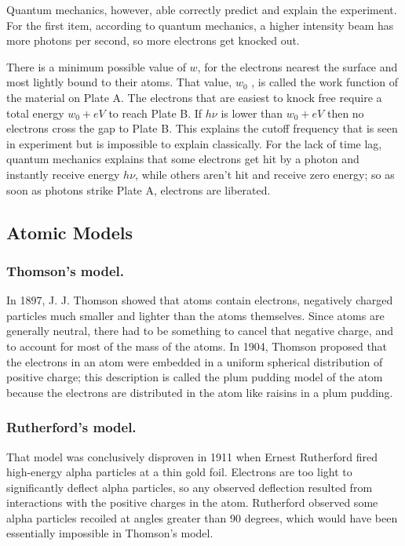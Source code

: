 \documentclass[../main.tex]{subfiles}
\begin{document}
Quantum mechanics, however, able correctly predict and explain the experiment. For the first item, according to quantum mechanics, a higher intensity beam has more photons per second, so more electrons get knocked out. 

There is a minimum possible value of $w$, for the electrons nearest the surface and most lightly bound to their atoms. That value, $w_0$ , is called the work function of the material on Plate A. The electrons that are easiest to knock free require a total energy $w_0 + eV $ to reach Plate B. If $h\nu$ is lower than $w_0 + eV$ then no electrons cross the gap to Plate B. This explains the cutoff frequency that is seen in experiment but is impossible to explain classically. For the lack of time lag, quantum mechanics explains that some electrons get hit by a photon and instantly receive energy $h\nu$, while others aren't hit and receive zero energy; so as soon as photons strike Plate A, electrons are liberated.

\subsection*{Atomic Models}
\subsubsection*{Thomson's model.} In 1897, J. J. Thomson showed that atoms contain electrons, negatively charged particles much smaller and lighter than the atoms themselves. Since atoms are generally neutral, there had to be something to cancel that negative charge, and to account for most of the mass of the atoms. In 1904, Thomson proposed that the electrons in an atom were embedded in a uniform spherical distribution of positive charge; this description is called the plum pudding model of the atom because the electrons are distributed in the atom like raisins in a plum pudding.

\subsubsection*{Rutherford's model.} That model was conclusively disproven in 1911 when Ernest Rutherford fired high-energy alpha particles at a thin gold foil. Electrons are too light to significantly deflect alpha particles, so any observed deflection resulted from interactions with the positive charges in the atom. Rutherford observed some alpha particles recoiled at angles greater than 90 degrees, which would have been essentially impossible in Thomson's model. 
\end{document}
